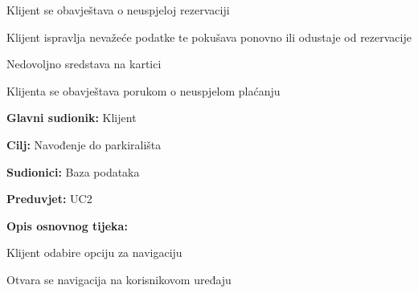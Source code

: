 \begin{packed_item}
\begin{packed_item}
\begin{packed_enum}
			\item Klijent se obavještava o neuspjeloj rezervaciji
			\item Klijent ispravlja nevažeće podatke te pokušava ponovno ili odustaje od rezervacije
			
		\end{packed_enum}
		
		\item[5.a] Nedovoljno sredstava na kartici
		\item[] \begin{packed_enum}
			
			\item Klijenta se obavještava porukom o neuspjelom plaćanju
			
		\end{packed_enum}
		
	\end{packed_item}
		
\end{packed_item}

\pagebreak

\noindent {}
\begin{packed_item}
	
	\item \textbf{Glavni sudionik:} Klijent
	\item  \textbf{Cilj:} Navođenje do parkirališta
	\item  \textbf{Sudionici:} Baza podataka
	\item  \textbf{Preduvjet:} UC2
	\item  \textbf{Opis osnovnog tijeka:}
	
	\item[] \begin{packed_enum}
		
		\item Klijent odabire opciju za navigaciju
		\item Otvara se navigacija na korisnikovom uređaju
		
	\end{packed_enum}
\end{packed_item}

